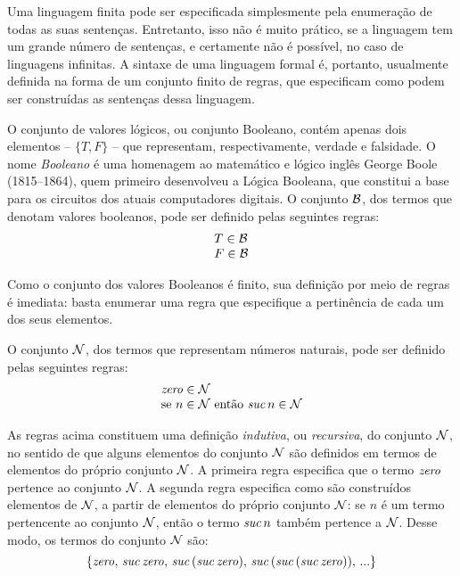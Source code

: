 Uma linguagem finita pode ser especificada simplesmente pela enumera\c{c}\~ao de todas as suas  sentenças. Entretanto, isso não é muito prático, se a linguagem tem um grande número de sentenças, e certamente não é possível, no caso de linguagens infinitas. A sintaxe de uma linguagem formal é, portanto, usualmente definida na forma de um conjunto finito de regras, que especificam como podem ser construídas as sentenças dessa linguagem.


\begin{Definition}
  O conjunto de valores lógicos, ou conjunto Booleano, contém apenas dois elementos -- $\{T,F\}$ -- que representam, respectivamente, verdade e falsidade. O nome \emph{Booleano} é uma homenagem ao matemático e lógico inglês George Boole  (1815--1864), quem primeiro desenvolveu a Lógica Booleana, que constitui a base para os circuitos dos atuais computadores digitais. O conjunto $\mathcal{B}$, dos termos que denotam valores booleanos, pode ser definido pelas seguintes regras:
  \[
      \begin{array}{l}
        T \in\mathcal{B}\\
        F \in\mathcal{B}
      \end{array}
  \]
\end{Definition}

Como o conjunto dos valores Booleanos \'e finito, sua defini\c{c}\~ao por meio de regras \'e imediata: basta enumerar uma regra que especifique a pertinência de cada um dos seus elementos.

\begin{Definition}\label{def:syn:nat}
O conjunto $\mathcal{N}$, dos termos que representam n\'umeros naturais, pode ser definido pelas seguintes regras:
\[
   \begin{array}{l}
     \textit{zero\/} \in \mathcal{N}\\
     \text{se $n \in \mathcal{N}$ ent\~ao $\textit{suc\/}\, n\in\mathcal{N}$}
   \end{array}
\]
\end{Definition}
As regras acima constituem uma definição \emph{indutiva}, ou \emph{recursiva\/}, do conjunto $\mathcal{N}$, no sentido de que alguns elementos do conjunto $\mathcal{N}$ são definidos em termos de elementos do próprio conjunto $\mathcal{N}$. A primeira regra especifica que o termo $\textit{zero\/}$ pertence ao conjunto $\mathcal{N}$. A segunda regra especifica como são construídos elementos de $\mathcal{N}$, a partir de elementos do próprio conjunto $\mathcal{N}$:  se $n$ \'e um termo pertencente ao conjunto $\mathcal{N}$, ent\~ao o termo $\textit{suc\/}\,n$ tamb\'em pertence a $\mathcal{N}$. Desse modo, os termos do conjunto $\mathcal{N}$ são:
\[ \{\textit{zero\/},\,\textit{suc\/}\,\textit{zero\/},\,\textit{suc\/}\,(\textit{suc\/}\,\textit{zero\/}),\, \textit{suc\/}\,(\textit{suc\/}\,(\textit{suc\/}\,\textit{zero\/})),\,...\} \]

